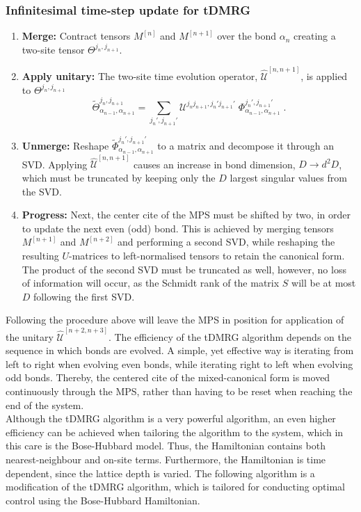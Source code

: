 \subsubsection{Infinitesimal time-step update for tDMRG}
\begin{enumerate}
\item
\textbf{Merge:} Contract tensors $M^{[n]}$ and $M^{[n+1]}$ over the bond $\alpha_{n}$ creating a two-site tensor $\Theta^{j_n , j_{n+1}}$.

\item
\textbf{Apply unitary:} The two-site time evolution operator, $\hat{\mathcal{U}}^{[n, n+1]}$, is applied to $\Theta^{j_n , j_{n+1}}$
\begin{equation}
	\tilde{\Theta}_{\alpha_{n-1} , \alpha_{n+1}}^{j_n , j_{n+1} } = \sum_{j_n ', j_{n+1}'} \mathcal{U}^{j_n  j_{n+1} , j_n '  j_{n+1}'} \; \Phi_{\alpha_{n-1} , \alpha_{n+1}}^{j_n ', j_{n+1} ' } \; .
\end{equation}

\item
\textbf{Unmerge:} Reshape $\tilde{\Phi}_{\alpha_{n-1} , \alpha_{n+1}}^{j_n ', j_{n+1} '}$ to a matrix and decompose it through an SVD. Applying $\hat{\mathcal{U}}^{[n, n+1]}$ causes an increase in bond dimension, $D \rightarrow d^2 D$, which must be truncated by keeping only the $D$ largest singular values from the SVD. 

\item
\textbf{Progress:}  Next, the center cite of the MPS must be shifted by two, in order to update the next even (odd) bond. This is achieved by merging tensors $M^{[n+1]}$ and $M^{[n+2]}$ and performing a second SVD, while reshaping the resulting $U$-matrices to left-normalised tensors to retain the canonical form. The product of the second SVD must be truncated as well, however, no loss of information will occur, as the Schmidt rank of the matrix $S$ will be at most $D$ following the first SVD. 
\end{enumerate}
Following the procedure above will leave the MPS in position for application of the unitary $\hat{\mathcal{U}}^{[n+2 , n+3]}$. The efficiency of the tDMRG algorithm depends on the sequence in which bonds are evolved. A simple, yet effective way is iterating from left to right when evolving even bonds, while iterating right to left when evolving odd bonds. Thereby, the centered cite of the mixed-canonical form is moved continuously through the MPS, rather than having to be reset when reaching the end of the system.\\
Although the tDMRG algorithm is a very powerful algorithm, an even higher efficiency can be achieved when tailoring the algorithm to the system, which in this care is the Bose-Hubbard model. Thus, the Hamiltonian contains both nearest-neighbour and on-site terms. Furthermore, the Hamiltonian is time dependent, since the lattice depth is varied. The following algorithm is a modification of the tDMRG algorithm, which is tailored for conducting optimal control using the Bose-Hubbard Hamiltonian.



